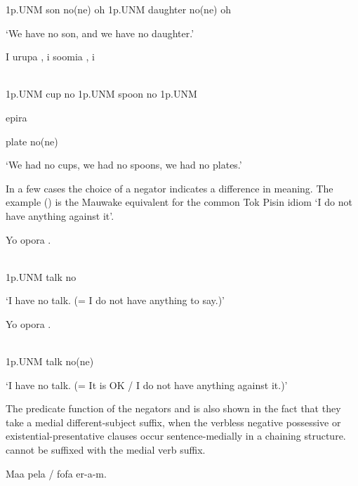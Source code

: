 1p.UNM  son  no(ne)  oh  1p.UNM  daughter  no(ne)  oh

`We have no son, and we have no daughter.'

\ea%
\label{ex:x1127}
\gll I  urupa  ,  i  soomia  ,  i  \\
      \\
\glt
\z

1p.UNM  cup  no  1p.UNM  spoon  no  1p.UNM

epira  

plate  no(ne)

`We had no cups, we had no spoons, we had no plates.'

In a few cases the choice of a negator indicates a difference in meaning. The example () is the Mauwake equivalent for the common Tok Pisin idiom  `I do not have anything against it'.

\ea%
\label{ex:x1129}
\gll Yo  opora  . \\
      \\
\glt
\z

1p.UNM  talk  no

`I have no talk. (= I do not have anything to say.)'

\ea%
\label{ex:x1130}
\gll Yo  opora  . \\
      \\
\glt
\z

1p.UNM  talk  no(ne)

`I have no talk. (= It is OK / I do not have anything against it.)'

The predicate function of the negators  and  is also shown in the fact that they take a medial different-subject suffix, when the verbless negative possessive or existential-presentative clauses occur sentence-medially in a chaining structure.  cannot be suffixed with the medial verb suffix.

\ea%
\label{ex:x1101}
\gll Maa  pela    /    fofa  er-a-m. \\
      \\
\glt
\z

